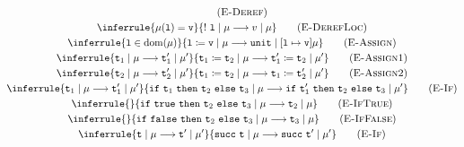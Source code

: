 \documentclass{article}
\newcommand{\code}{\mathtt}
\newcommand{\ruleTag}[1]{\label{#1}\tag{\textsc{#1}}}
\DeclareMathOperator{\domain}{dom}
\begin{document}
\begin{gather}
\ruleTag{E-Deref} \\
\inferrule
{\mu(\code{l}) = \code{v}}
{\code{!}\ \code{l}\mid\mu\longrightarrow v\mid\mu}
\ruleTag{E-DerefLoc} \\
\inferrule
{\code{l}\in\domain(\mu)}
{\code{l}\coloneqq\code{v}\mid\mu\longrightarrow \code{unit}\mid[\code{l}\mapsto\code{v}]\mu}
\ruleTag{E-Assign} \\
\inferrule
{\code{t}_1\mid\mu\longrightarrow\code{t}'_1\mid\mu'}
{\code{t}_1\coloneqq\code{t}_2\mid\mu\longrightarrow \code{t}'_1\coloneqq\code{t}_2\mid\mu'}
\ruleTag{E-Assign1} \\
\inferrule
{\code{t}_2\mid\mu\longrightarrow\code{t}'_2\mid\mu'}
{\code{t}_1\coloneqq\code{t}_2\mid\mu\longrightarrow \code{t}_1\coloneqq\code{t}'_2\mid\mu'}
\ruleTag{E-Assign2} \\
\inferrule
{\code{t}_1\mid\mu\longrightarrow\code{t}'_1\mid\mu'}
{\code{if}\ \code{t}_1\ \code{then}\ \code{t}_2\ \code{else}\ \code{t}_3\mid\mu\longrightarrow \code{if}\ \code{t}'_1\ \code{then}\ \code{t}_2\ \code{else}\ \code{t}_3\mid\mu'}
\ruleTag{E-If} \\
\inferrule
{}
{\code{if}\ \code{true}\ \code{then}\ \code{t}_2\ \code{else}\ \code{t}_3\mid\mu\longrightarrow \code{t}_2\mid\mu}
\ruleTag{E-IfTrue} \\
\inferrule
{}
{\code{if}\ \code{false}\ \code{then}\ \code{t}_2\ \code{else}\ \code{t}_3\mid\mu\longrightarrow \code{t}_3\mid\mu}
\ruleTag{E-IfFalse} \\
\inferrule
{\code{t}\mid\mu\longrightarrow\code{t}'\mid\mu'}
{\code{succ}\ \code{t}\mid\mu\longrightarrow \code{succ}\ \code{t}'\mid\mu'}
\ruleTag{E-If}
\end{gather}
\end{document}
